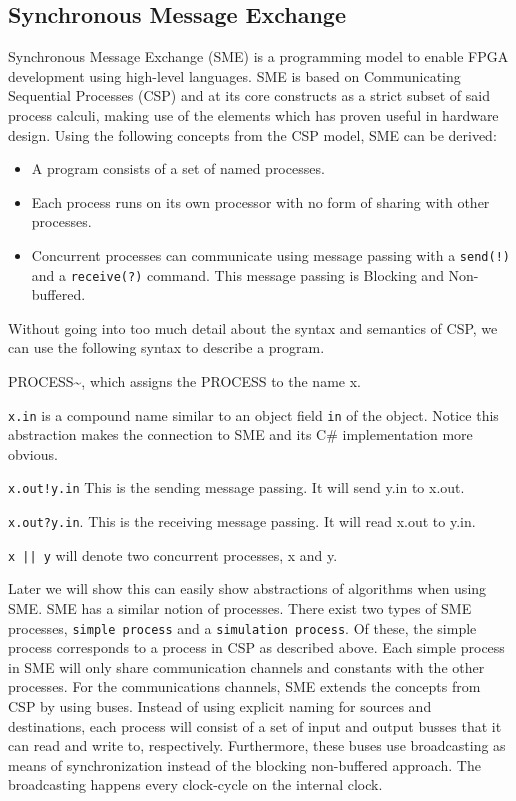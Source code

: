 \documentclass[a4paper]{article}
\begin{document}
\subsection{Synchronous Message Exchange}
\label{sec:org1dd3ff1}
Synchronous Message Exchange (SME) is a programming model to enable FPGA development using high-level languages. SME is based on Communicating Sequential Processes (CSP) and at its core constructs as a strict subset of said process calculi, making use of the elements which has proven useful in hardware design\cite{sme}. Using the following concepts from the CSP model, SME can be derived:
\begin{itemize}
\item A program consists of a set of named processes.
\item Each process runs on its own processor with no form of sharing with other processes.
\item Concurrent processes can communicate using message passing with a \texttt{send(!)} and a \texttt{receive(?)} command. This message passing is Blocking and Non-buffered.
\end{itemize}
Without going into too much detail about the syntax and semantics of CSP\cite{CSP}, we can use the following syntax to describe a program.
\begin{description}
\item[{\textasciitilde{}x}] PROCESS\textasciitilde{}, which assigns the PROCESS to the name x.
\item \texttt{x.in} is a compound name similar to an object field \texttt{in} of the object. Notice this abstraction makes the connection to SME and its C\# implementation more obvious.
\item \texttt{x.out!y.in} This is the sending message passing. It will send y.in to x.out.
\item \texttt{x.out?y.in}. This is the receiving message passing. It will read x.out to y.in.
\item \texttt{x || y} will denote two concurrent processes, x and y.
\end{description}
Later we will show this can easily show abstractions of algorithms when using SME. SME has a similar notion of processes. There exist two types of SME processes, \texttt{simple process} and a \texttt{simulation process}. Of these, the simple process corresponds to a process in CSP as described above. Each simple process in SME will only share communication channels and constants with the other processes. For the communications channels, SME extends the concepts from CSP by using buses. Instead of using explicit naming for sources and destinations, each process will consist of a set of input and output busses that it can read and write to, respectively. Furthermore, these buses use broadcasting as means of synchronization instead of the blocking non-buffered approach.  The broadcasting happens every clock-cycle on the internal clock.
\end{document}
